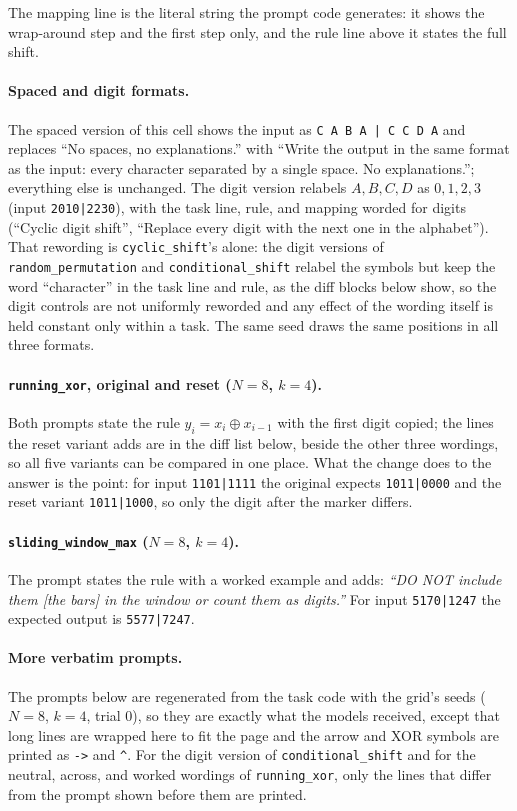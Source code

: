 \documentclass[10pt]{article} %
\newcommand{\task}[1]{\texttt{#1}}
\begin{document}
The mapping line is the literal string the prompt code generates: it shows the wrap-around step and the first step only, and the rule line above it states the full shift.

\paragraph{Spaced and digit formats.} The spaced version of this cell shows the input as \texttt{C A B A | C C D A} and replaces ``No spaces, no explanations.'' with ``Write the output in the same format as the input: every character separated by a single space. No explanations.''; everything else is unchanged. The digit version relabels $A, B, C, D$ as $0, 1, 2, 3$ (input \texttt{2010|2230}), with the task line, rule, and mapping worded for digits (``Cyclic digit shift'', ``Replace every digit with the next one in the alphabet''). That rewording is \task{cyclic\_shift}'s alone: the digit versions of \task{random\_permutation} and \task{conditional\_shift} relabel the symbols but keep the word ``character'' in the task line and rule, as the diff blocks below show, so the digit controls are not uniformly reworded and any effect of the wording itself is held constant only within a task. The same seed draws the same positions in all three formats.

\paragraph{\task{running\_xor}, original and reset ($N = 8$, $k = 4$).} Both prompts state the rule $y_i = x_i \oplus x_{i-1}$ with the first digit copied; the lines the reset variant adds are in the diff list below, beside the other three wordings, so all five variants can be compared in one place. What the change does to the answer is the point: for input \texttt{1101|1111} the original expects \texttt{1011|0000} and the reset variant \texttt{1011|1000}, so only the digit after the marker differs.

\paragraph{\task{sliding\_window\_max} ($N = 8$, $k = 4$).} The prompt states the rule with a worked example and adds: \emph{``DO NOT include them [the bars] in the window or count them as digits.''} For input \texttt{5170|1247} the expected output is \texttt{5577|7247}.

\paragraph{More verbatim prompts.} The prompts below are regenerated from the task code with the grid's seeds ($N = 8$, $k = 4$, trial 0), so they are exactly what the models received, except that long lines are wrapped here to fit the page and the arrow and XOR symbols are printed as \texttt{->} and \texttt{\^{}}. For the digit version of \task{conditional\_shift} and for the neutral, across, and worked wordings of \task{running\_xor}, only the lines that differ from the prompt shown before them are printed.
\end{document}
